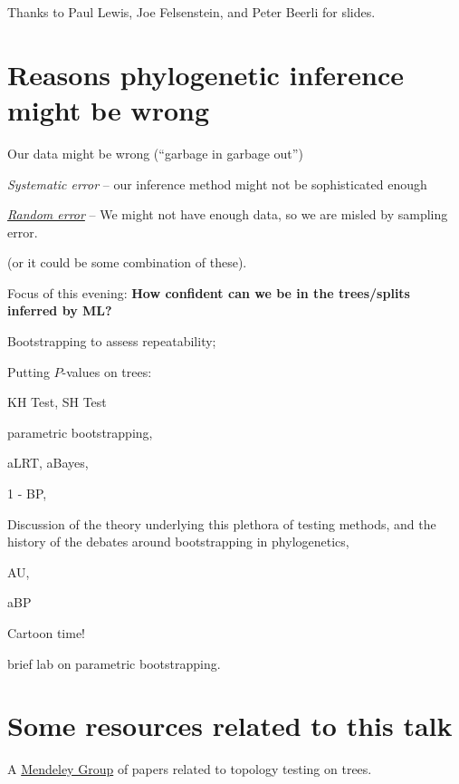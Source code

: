 \documentclass[landscape]{foils}
\begin{document}
\myNewSlide
\huge 
Thanks to Paul Lewis, Joe Felsenstein, and Peter Beerli for slides.

\myNewSlide
\section*{Reasons phylogenetic inference might be wrong}
\Large
\begin{compactenum}
	\item Our data might be wrong (``garbage in garbage out'')
	\item {\em Systematic error} -- our inference method might not be sophisticated enough
	\item \underline{{\em Random error}} -- We might not have enough data, so we are misled by sampling error.
\end{compactenum}

(or it could be some combination of these).

{Focus of this evening: {\bf How confident can we be in the trees/splits inferred by ML?}}

\myNewSlide
\begin{compactenum}
	\item Bootstrapping to assess repeatability;
	\item Putting $P$-values on trees:
	\begin{compactitem}
		\item KH Test, SH Test
		\item parametric bootstrapping,
		\item aLRT, aBayes,
		\item 1 - BP,
		\item Discussion of the theory underlying this plethora of testing methods, and the history of the debates around bootstrapping in phylogenetics,
		\item AU,
		\item aBP
	\end{compactitem}
	\item Cartoon time!
	\item brief lab on parametric bootstrapping.
\end{compactenum}

\myNewSlide
\section*{Some resources related to this talk}
A \href{http://www.mendeley.com/groups/1275263/confidence-on-phylogenetic-trees/}{Mendeley Group} of papers related to topology testing on trees.
\end{document}
